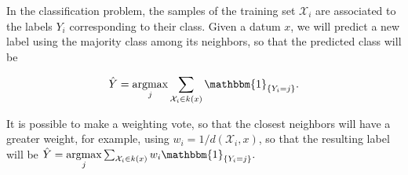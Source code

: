 
In the classification problem, the samples of the training set
$\mathcal{X}_i$ are associated to the labels $Y_i$ corresponding to their class.
Given a datum $x$, we will predict a new label using the majority class among
its neighbors, so that the predicted class will be

$$
\hat Y =\underset{j}{\operatorname{argmax}} \sum_{\mathcal{X}_i \in k(x)} \mathbbm{1}_{\{ Y_i = j\}}.
$$

It is possible to make a weighting vote, so that the closest neighbors will have
a greater weight, for example, using $w_i=1/d(\mathcal{X}_i, x)$, so that the
resulting label will be
$
\hat Y = \underset{j}{\operatorname{argmax}}  \sum_{\mathcal{X}_i \in k(x)} w_i\mathbbm{1}_{\{ Y_i = j\}}.
$
